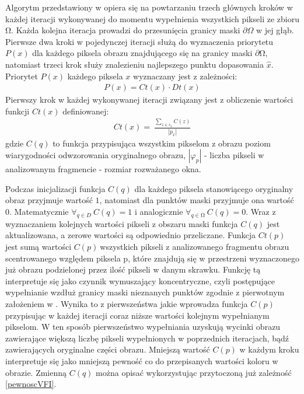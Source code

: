 \documentclass[12pt, twoside, openany]{report}
\theoremstyle{definition}
\begin{document}
Algorytm przedstawiony w \cite{criminisi2004region} opiera się na powtarzaniu trzech głównych kroków w każdej iteracji wykonywanej do momentu wypełnienia wszystkich pikseli ze zbioru $\mathrm{\Omega }$.
Każda kolejna iteracja prowadzi do przesunięcia granicy maski $\partial \Omega$ w jej głąb.
 Pierwsze dwa kroki w pojedynczej iteracji służą do wyznaczenia priorytetu $P \left( x \right)$ dla każdego piksela obrazu znajdującego się na granicy maski $\partial \mathrm{\Omega}$, natomiast trzeci krok służy znalezieniu najlepszego punktu dopasowania $\hat{x}$.
Priorytet $P \left( x \right)$ każdego piksela $x$ wyznaczany jest z zależności:
\begin{align}
P\left( x \right)=Ct(x)\cdot Dt(x)
\label{PRIORITY}
\end{align}
Pierwszy krok w każdej wykonywanej iteracji związany jest z obliczenie wartości funkcji $Ct(x)$ definiowanej:
\begin{align}
Ct\left( x \right)=\ \frac{\sum_{z \in s_x} {C(z)}}{\left|p_x\right|}
\label{confidenceTerm}
\end{align}
gdzie $C(q)$ to funkcja przypisująca wszystkim pikselom z obrazu poziom wiarygodności odwzorowania oryginalnego obrazu, $\left|{\varphi }_p\right|$ - liczba pikseli w analizowanym fragmencie - rozmiar rozważanego okna. 
\par
Podczas inicjalizacji funkcja $C(q)$ dla każdego piksela stanowiącego oryginalny obraz przyjmuje wartość $1$, natomiast dla punktów maski przyjmuje ona wartość $0$. Matematycznie ${\forall }_{q\in D}\ C\left(q\right)=1$  i analogicznie ${\forall }_{q\in \mathrm{\Omega }}\ C\left(q\right)=0$. Wraz z wyznaczaniem kolejnych wartości pikseli z obszaru maski funkcja $C\left(q\right)$ jest aktualizowana, a zerowe wartości są odpowiednio przeliczane. Funkcja $Ct\left(p\right)$ jest sumą wartości $C\left(p\right)\ $wszystkich pikseli z analizowanego fragmentu obrazu scentrowanego względem piksela p, które znajdują się w przestrzeni wyznaczonego już obrazu podzielonej przez ilość pikseli w danym skrawku. Funkcję tą interpretuje się jako czynnik wymuszający koncentryczne, czyli postępujące wypełnianie wzdłuż granicy maski nieznanych punktów zgodnie z pierwotnym założeniem w \cite{efros1999texture}. Wynika to z pierwszeństwa jakie wprowadza funkcja $C\left(p\right)$ przypisując w każdej iteracji coraz niższe wartości kolejnym wypełnianym pikselom. W ten sposób pierwszeństwo wypełniania uzyskują wycinki obrazu zawierające większą liczbę pikseli wypełnionych w poprzednich iteracjach, bądź zawierających oryginalne części obrazu. Mniejszą wartość $C\left(p\right)$ w każdym kroku interpretuje się jako mniejszą pewność co do przepisanych wartości koloru w obrazie. Zmienną $C(q)$ można opisać wykorzystując przytoczoną już zależność \eqref{pewnoscVFI}.
\end{document}
